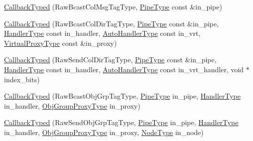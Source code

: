 \begin{DoxyCompactItemize}
\item 
\hyperlink{structvt_1_1pipe_1_1callback_1_1cbunion_1_1_callback_typed_a4b5c8df6aa46634bde0318f7b8017123}{Callback\+Typed} (Raw\+Bcast\+Col\+Msg\+Tag\+Type, \hyperlink{namespacevt_ac9852acda74d1896f48f406cd72c7bd3}{Pipe\+Type} const \&in\+\_\+pipe)
\item 
\hyperlink{structvt_1_1pipe_1_1callback_1_1cbunion_1_1_callback_typed_a740587b83455cae5c3a65bb26dd7e53c}{Callback\+Typed} (Raw\+Bcast\+Col\+Dir\+Tag\+Type, \hyperlink{namespacevt_ac9852acda74d1896f48f406cd72c7bd3}{Pipe\+Type} const \&in\+\_\+pipe, \hyperlink{namespacevt_af64846b57dfcaf104da3ef6967917573}{Handler\+Type} const in\+\_\+handler, \hyperlink{structvt_1_1pipe_1_1callback_1_1cbunion_1_1_callback_raw_base_single_a734a9c83099de5bc1cd85f9da8dba7bb}{Auto\+Handler\+Type} const in\+\_\+vrt, \hyperlink{namespacevt_a1b417dd5d684f045bb58a0ede70045ac}{Virtual\+Proxy\+Type} const \&in\+\_\+proxy)
\item 
\hyperlink{structvt_1_1pipe_1_1callback_1_1cbunion_1_1_callback_typed_a4f4f239a8ab68f5f6ac6067df9af2995}{Callback\+Typed} (Raw\+Send\+Col\+Dir\+Tag\+Type, \hyperlink{namespacevt_ac9852acda74d1896f48f406cd72c7bd3}{Pipe\+Type} const \&in\+\_\+pipe, \hyperlink{namespacevt_af64846b57dfcaf104da3ef6967917573}{Handler\+Type} const in\+\_\+handler, \hyperlink{structvt_1_1pipe_1_1callback_1_1cbunion_1_1_callback_raw_base_single_a734a9c83099de5bc1cd85f9da8dba7bb}{Auto\+Handler\+Type} const in\+\_\+vrt\+\_\+handler, void $\ast$index\+\_\+bits)
\item 
\hyperlink{structvt_1_1pipe_1_1callback_1_1cbunion_1_1_callback_typed_a0be373f1ebb6916b873f329d82dd76ce}{Callback\+Typed} (Raw\+Bcast\+Obj\+Grp\+Tag\+Type, \hyperlink{namespacevt_ac9852acda74d1896f48f406cd72c7bd3}{Pipe\+Type} in\+\_\+pipe, \hyperlink{namespacevt_af64846b57dfcaf104da3ef6967917573}{Handler\+Type} in\+\_\+handler, \hyperlink{namespacevt_ad7cae989df485fccca57f0792a880a8e}{Obj\+Group\+Proxy\+Type} in\+\_\+proxy)
\item 
\hyperlink{structvt_1_1pipe_1_1callback_1_1cbunion_1_1_callback_typed_ac60ced3929a744b3953b7b96b4185c5b}{Callback\+Typed} (Raw\+Send\+Obj\+Grp\+Tag\+Type, \hyperlink{namespacevt_ac9852acda74d1896f48f406cd72c7bd3}{Pipe\+Type} in\+\_\+pipe, \hyperlink{namespacevt_af64846b57dfcaf104da3ef6967917573}{Handler\+Type} in\+\_\+handler, \hyperlink{namespacevt_ad7cae989df485fccca57f0792a880a8e}{Obj\+Group\+Proxy\+Type} in\+\_\+proxy, \hyperlink{namespacevt_a866da9d0efc19c0a1ce79e9e492f47e2}{Node\+Type} in\+\_\+node)
\item 

\end{DoxyCompactItemize}
